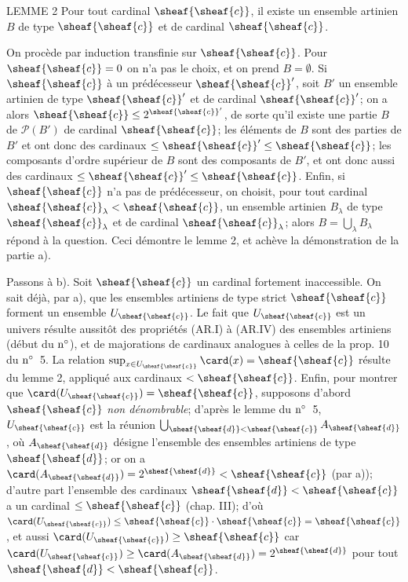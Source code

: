 \begin{enonce*}{LEMME 2}
Pour tout cardinal $\sheaf{\sheaf{c}}$, il existe un ensemble
artinien $B$ de type $\sheaf{\sheaf{c}}$ et de cardinal
$\sheaf{\sheaf{c}}$.
\end{enonce*}

On procède par induction transfinie sur $\sheaf{\sheaf{c}}$. Pour
$\sheaf{\sheaf{c}}=0$ on n'a pas le choix, et on prend
$B=∅$. Si $\sheaf{\sheaf{c}}$ à un prédécesseur
$\sheaf{\sheaf{c}}'$, soit $B'$ un ensemble artinien de type
$\sheaf{\sheaf{c}}'$ et de cardinal $\sheaf{\sheaf{c}}'$; on a alors
$\sheaf{\sheaf{c}}\leq 2^{\sheaf{\sheaf{c}}'}$, de sorte qu'il
existe une partie $B$ de $\mathcal{P}(B')$ de cardinal
$\sheaf{\sheaf{c}}$; les éléments de $B$ sont des parties de $B'$ et
ont donc des cardinaux $\leq \sheaf{\sheaf{c}}' \leq
\sheaf{\sheaf{c}}$; les composants d'ordre supérieur de $B$ sont des
composants de $B'$, et ont donc aussi des cardinaux $\leq
\sheaf{\sheaf{c}}' \leq \sheaf{\sheaf{c}}$. Enfin, si
$\sheaf{\sheaf{c}}$ n'a pas de prédécesseur, on choisit, pour tout
cardinal $\sheaf{\sheaf{c}}_{\lambda}<\sheaf{\sheaf{c}}$, un
ensemble artinien $B_{\lambda}$ de type
$\sheaf{\sheaf{c}}_{\lambda}$ et de cardinal
$\sheaf{\sheaf{c}}_{\lambda}$; alors $B=\bigcup _{\lambda}
B_{\lambda}$ répond à la question. Ceci démontre le lemme 2, et
achève la démonstration de la partie a).

Passons à b). Soit $\sheaf{\sheaf{c}}$ un cardinal fortement
inaccessible. On sait déjà, par a), que les ensembles artiniens de
type strict $\sheaf{\sheaf{c}}$ forment un ensemble
$U_{\sheaf{\sheaf{c}}}$. Le fait que $U_{\sheaf{\sheaf{c}}}$ est un
univers résulte aussitôt des propriétés (AR.I) à (AR.IV) des
ensembles artiniens (début du ${\rm n^{\circ}}$), et\pageoriginale
de majorations de cardinaux analogues à celles de la prop. 10 du
${\rm n^{\circ}}$~5. La relation $\sup_{x\in U_{\sheaf{\sheaf{c}}}}
\card(x)=\sheaf{\sheaf{c}}$ résulte%
 du lemme 2, appliqué aux cardinaux $<\sheaf{\sheaf{c}}$. Enfin,
 pour montrer
que $\card(U_{\sheaf{\sheaf{c}}})=\sheaf{\sheaf{c}}$, supposons
d'abord $\sheaf{\sheaf{c}}$ \emph{non dénombrable}; d'après%
 le lemme du ${\rm n^{\circ}}$~5,
$U_{\sheaf{\sheaf{c}}}$ est la réunion
$\bigcup_{\sheaf{\sheaf{d}}<\sheaf{\sheaf{c}}}
A_{\sheaf{\sheaf{d}}}$, où $A_{\sheaf{\sheaf{d}}}$ désigne
l'ensemble des ensembles artiniens de type $\sheaf{\sheaf{d}}$; or
on a
$\card(A_{\sheaf{\sheaf{d}}})=2^{\sheaf{\sheaf{d}}}<\sheaf{\sheaf{c}}$
(par a)); d'autre part l'ensemble des cardinaux
$\sheaf{\sheaf{d}}<\sheaf{\sheaf{c}}$ a un cardinal $\leq
\sheaf{\sheaf{c}}$ (chap. III); d'où
$\card(U_{\sheaf{\sheaf{c}}})\leq \sheaf{\sheaf{c}} \cdot
\sheaf{\sheaf{c}}=\sheaf{\sheaf{c}}$, et aussi
$\card(U_{\sheaf{\sheaf{c}}})\geq \sheaf{\sheaf{c}}$ car
$\card(U_{\sheaf{\sheaf{c}}})\geq
\card(A_{\sheaf{\sheaf{d}}})=2^{\sheaf{\sheaf{d}}}$ pour tout
$\sheaf{\sheaf{d}}<\sheaf{\sheaf{c}}$.


